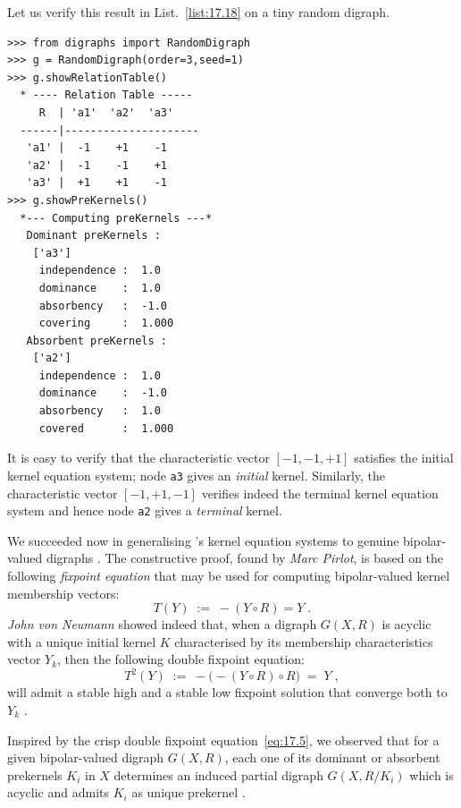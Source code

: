 Let us verify this result in List.~\vref{list:17.18} on a tiny random digraph.
\begin{lstlisting}[caption={Verifying the \Berge kernel equation on a tiny random digraph},label=list:17.18]
>>> from digraphs import RandomDigraph
>>> g = RandomDigraph(order=3,seed=1)
>>> g.showRelationTable()
  * ---- Relation Table -----
     R  | 'a1'  'a2'  'a3'	  
  ------|---------------------
   'a1' |  -1    +1    -1	 
   'a2' |  -1    -1    +1	 
   'a3' |  +1    +1    -1	 
>>> g.showPreKernels()
  *--- Computing preKernels ---*
   Dominant preKernels :
    ['a3']
     independence :  1.0
     dominance    :  1.0
     absorbency   :  -1.0
     covering     :  1.000
   Absorbent preKernels :
    ['a2']
     independence :  1.0
     dominance    :  -1.0
     absorbency   :  1.0
     covered      :  1.000
\end{lstlisting}
It is easy to verify that the characteristic vector $[-1, -1, +1]$ satisfies the initial kernel equation system; node \texttt{a3} gives an \emph{initial} kernel. Similarly, the characteristic vector $[-1, +1, -1]$ verifies indeed the terminal kernel equation system and hence node \texttt{a2} gives a \emph{terminal} kernel.

We succeeded now in generalising \Berge's kernel equation systems to genuine bipolar-valued digraphs \citep*{BIS-2006a,BIS-2006b}. The constructive proof, found by \emph{Marc Pirlot}, is based on the following \emph{fixpoint equation} that may be used for computing bipolar-valued kernel membership vectors:
\begin{equation}\label{eq:17.4}
T(Y) \; := \; -(Y \circ R) = Y\;.
\end{equation}
\emph{John von Neumann} showed indeed that, when a digraph $G(X,R)$ is acyclic with a unique initial kernel $K$ characterised by its membership characteristics vector $Y_k$, then the following double fixpoint equation:
\begin{equation}\label{eq:17.5}
T^2(Y) \; := \; -\big( -(Y \circ R) \circ R) \; = \; Y\;,
\end{equation}
will admit a stable high and a stable low fixpoint solution that converge both to $Y_k$ \citep{SCH-1985}.

Inspired by the crisp double fixpoint equation~\vref{eq:17.5}, we observed that for a given bipolar-valued digraph $G(X,R)$, each one of its dominant or absorbent prekernels $K_i$ in $X$ determines an induced partial digraph $G(X,R/K_i)$ which is acyclic and admits $K_i$ as unique prekernel \citep{BIS-2006b}.

